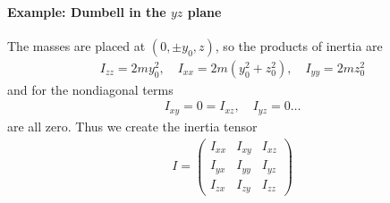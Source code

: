 \documentclass[../main.tex]{subfiles}
\begin{document}
\paragraph*{Example: Dumbell in the $yz$ plane} The masses are placed at $(0, \pm y_0, z)$, so the 
products of inertia are
\begin{align*}
    I_{zz} = 2m y_0^2, \quad I_{xx} = 2m(y_0^2 + z_0^2), \quad I_{yy} = 2m z_0^2
\end{align*}
and for the nondiagonal terms
\begin{align*}
    I_{xy} = 0 = I_{xz},\quad I_{yz} = 0 \dots
\end{align*}
are all zero. Thus we create the inertia tensor
\begin{align*}
    I = \begin{pmatrix}
        I_{xx} & I_{xy} & I_{xz} \\
        I_{yx} & I_{yy} & I_{yz} \\
        I_{zx} & I_{zy} & I_{zz}
    \end{pmatrix}
\end{align*}
\end{document}
